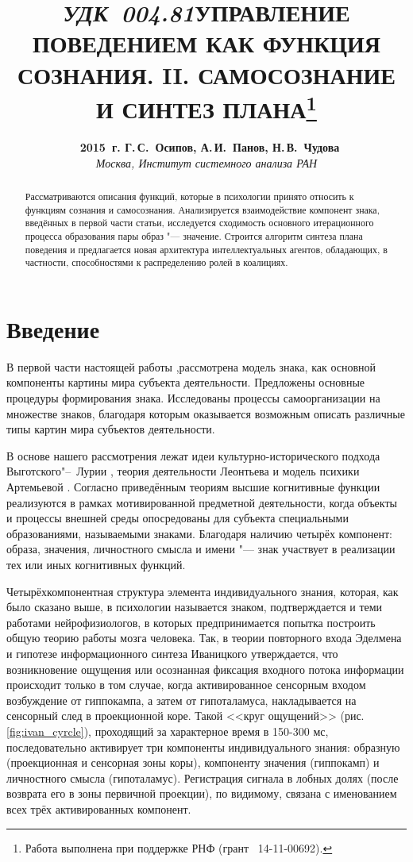 \documentclass[a4paper, 12pt]{article}
\title{\hbox{\normalsize\textit{УДК 004.81}}\hbox{}\textbf{\Large\MakeUppercase{Управление поведением как функция сознания. II. Самосознание и синтез плана}}\footnote{Работа выполнена при поддержке РНФ (грант \No\ 14-11-00692).}}
\author{\textbf{\textcopyright~2015~г. Г.\,С.~Осипов, А.\,И.~Панов, Н.\,В.~Чудова}\\\normalsize\textit{Москва, Институт системного анализа РАН}}
\date{}
\theoremstyle{plain}
\begin{document}
	\vspace*{-5\baselineskip}			%
	{\let\newpage\relax\maketitle}
	
	\begin{abstract}
		\noindent Рассматриваются описания функций, которые в психологии принято относить к функциям сознания и самосознания. Анализируется взаимодействие компонент знака, введённых в первой части статьи, исследуется сходимость основного итерационного процесса образования пары образ "--- значение. Строится алгоритм синтеза плана поведения и предлагается новая архитектура интеллектуальных агентов, обладающих, в частности, способностями к распределению ролей в коалициях.
	\end{abstract}	
	
	\section*{Введение}
	В первой части настоящей работы \cite{PanovA2014a},рассмотрена модель знака, как основной компоненты картины мира субъекта деятельности. Предложены основные процедуры формирования знака. Исследованы процессы самоорганизации на множестве знаков, благодаря которым оказывается возможным описать различные типы картин мира субъектов деятельности.
	
	В основе нашего рассмотрения лежат идеи культурно-исторического подхода Выготского"--~Лурии \cite{Luria1970,Vygotsky2005}, теория деятельности Леонтьева \cite{Leontiev1975} и модель психики Артемьевой \cite{Artemyeva1980}. Согласно приведённым теориям высшие когнитивные функции реализуются в рамках мотивированной предметной деятельности, когда объекты и процессы внешней  среды опосредованы для субъекта специальными образованиями, называемыми знаками. Благодаря наличию четырёх компонент: образа, значения, личностного смысла и имени "--- знак участвует в реализации тех или иных когнитивных функций. 
	
	Четырёхкомпонентная структура элемента индивидуального знания, которая, как было сказано выше, в психологии называется знаком, подтверждается и теми работами нейрофизиологов, в которых предпринимается попытка построить общую теорию работы мозга человека. Так, в теории повторного входа Эделмена \cite{Edelmen1981} и гипотезе информационного синтеза Иваницкого \cite{Ivanitsky1996,Ivanitsky2010} утверждается, что возникновение ощущения или осознанная фиксация входного потока информации происходит только в том случае, когда активированное сенсорным входом возбуждение от гиппокампа, а затем от гипоталамуса, накладывается на сенсорный след в проекционной коре. Такой <<круг ощущений>> (рис. \ref{fig:ivan_cyrcle}), проходящий за характерное время в 150-300 мс, последовательно активирует три компоненты индивидуального знания: образную (проекционная и сенсорная зоны коры), компоненту значения (гиппокамп) и личностного смысла (гипоталамус). Регистрация сигнала в лобных долях (после возврата его в зоны первичной проекции), по видимому, связана с именованием всех трёх активированных компонент.
	
\end{document}
